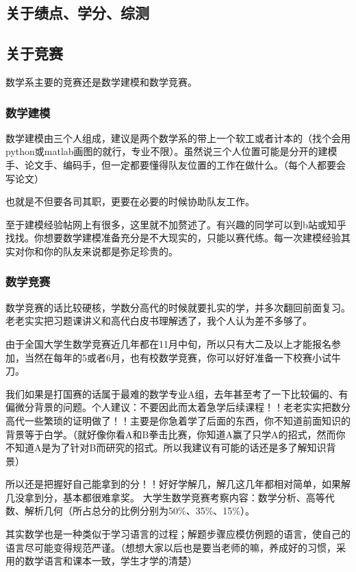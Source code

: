 \documentclass{my_paper}
\begin{document}
\subsection{关于绩点、学分、综测}

\subsection{关于竞赛}
数学系主要的竞赛还是数学建模和数学竞赛。
\subsubsection{数学建模}
数学建模由三个人组成，建议是两个数学系的带上一个软工或者计本的（找个会用python或matlab画图的就行，专业不限）。虽然说三个人位置可能是分开的建模手、论文手、编码手，但一定都要懂得队友位置的工作在做什么。（每个人都要会写论文）

也就是不但要各司其职，更要在必要的时候协助队友工作。

至于建模经验帖网上有很多，这里就不加赘述了。有兴趣的同学可以到b站或知乎找找。你想要数学建模准备充分是不大现实的，只能以赛代练。每一次建模经验其实对你和你的队友来说都是弥足珍贵的。
\subsubsection{数学竞赛}
数学竞赛的话比较硬核，学数分高代的时候就要扎实的学，并多次翻回前面复习。老老实实把习题课讲义和高代白皮书理解透了，我个人认为差不多够了。

由于全国大学生数学竞赛近几年都在11月中旬，所以只有大二及以上才能报名参加，当然在每年的5或者6月，也有校数学竞赛，你可以好好准备一下校赛小试牛刀。

我们如果是打国赛的话属于最难的数学专业A组，去年甚至考了一下比较偏的、有偏微分背景的问题。个人建议：不要因此而太着急学后续课程！！老老实实把数分高代一些繁琐的证明做了！！主要是你急着学了后面的东西，你不知道前面知识的背景等于白学。（就好像你看A和B拳击比赛，你知道A赢了只学A的招式，然而你不知道A是为了针对B而研究的招式。所以我建议有可能的话还是\textcolor[rgb]{1,0,0}{多了解知识背景}）

所以还是把握好自己能拿到的分！！\textcolor[rgb]{1,0,0}{好好学解几，解几这几年都相对简单，如果解几没拿到分，基本都很难拿奖。}
大学生数学竞赛考察内容：数学分析、高等代数、解析几何（所占总分的比例分别为50$\%$、35$\%$、15$\%$）。

其实数学也是一种类似于学习语言的过程；解题步骤应模仿例题的语言，使自己的语言尽可能变得规范严谨。（想想大家以后也是要当老师的嘛，养成好的习惯，采用的数学语言和课本一致，学生才学的清楚）
\end{document}
